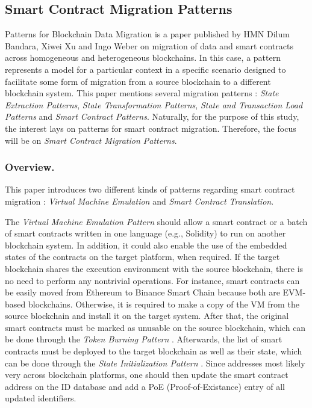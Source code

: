 \documentclass[runningheads]{llncs}
\begin{document}


\subsection{Smart Contract Migration Patterns} \label{migration-patterns}
Patterns for Blockchain Data Migration is a paper published by HMN Dilum Bandara, Xiwei Xu and Ingo Weber \cite{bandara_xu_weber_2019} on migration of data and smart contracts across homogeneous and heterogeneous blockchains. In this case, a pattern represents a model for a particular context in a specific scenario designed to facilitate some form of migration from a source blockchain to a different blockchain system. This paper mentions several migration patterns \cite{bandara_xu_weber_2019}: \textit{State Extraction Patterns}, \textit{State Transformation Patterns}, \textit{State and Transaction Load Patterns} and \textit{Smart Contract Patterns}. Naturally, for the purpose of this study, the interest lays on patterns for smart contract migration. Therefore, the focus will be on \textit{Smart Contract Migration Patterns}.

\subsubsection{Overview.}
This paper introduces two different kinds of patterns regarding smart contract migration \cite{bandara_xu_weber_2019}: \textit{Virtual Machine Emulation} and \textit{Smart Contract Translation}.

The \textit{Virtual Machine Emulation Pattern} should allow a smart contract or a batch of smart contracts written in one language (e.g., Solidity) to run on another blockchain system. In addition, it could also enable the use of the embedded states of the contracts on the target platform, when required. If the target blockchain shares the execution environment with the source blockchain, there is no need to perform any nontrivial operations. For instance, smart contracts can be easily moved from Ethereum to Binance Smart Chain because both are EVM-based blockchains. Otherwise, it is required to make a copy of the VM from the source blockchain and install it on the target system. After that, the original smart contracts must be marked as unusable on the source blockchain, which can be done through the \textit{Token Burning Pattern} \cite{bandara_xu_weber_2019}. Afterwards, the list of smart contracts must be deployed to the target blockchain as well as their state, which can be done through the \textit{State Initialization Pattern} \cite{bandara_xu_weber_2019}. Since addresses most likely very across blockchain platforms, one should then update the smart contract address on the ID database and add a PoE (Proof-of-Existance) entry of all updated identifiers.
\end{document}

